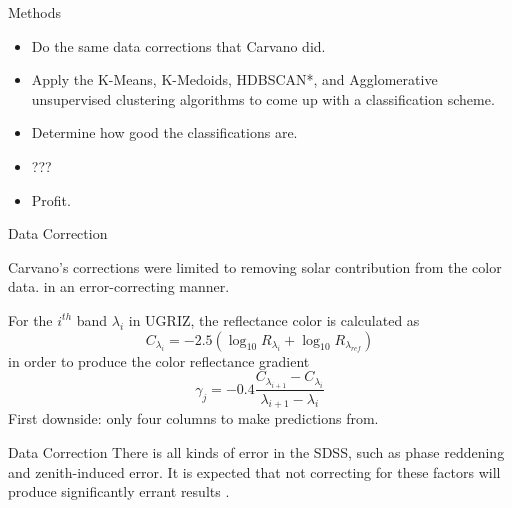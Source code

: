 \documentclass[10pt,xcolor={table,dvipsnames},t]{beamer}
\begin{document}
\begin{frame}{Methods}
\begin{itemize}
    \item Do the same data corrections that Carvano did.
    \item Apply the K-Means, K-Medoids, HDBSCAN*, and Agglomerative unsupervised clustering algorithms to come up with a classification scheme.
    \item Determine how good the classifications are.
    \item ???
    \item Profit.
\end{itemize}
\end{frame}

\begin{frame}{Data Correction}
\begin{itemize}
Carvano's corrections were limited to removing solar contribution from the color data. in an error-correcting manner.

For the $i^{th}$ band $\lambda_{i}$ in UGRIZ, the reflectance color is calculated as
$$
C_{\lambda_{i}} = -2.5\left(\log_{10}R_{\lambda_i} + \log_{10}R_{\lambda_{ref}} \right)
$$
in order to produce the color reflectance gradient 
$$
\gamma_{j} = -0.4\dfrac{C_{\lambda_{i + 1}} - C_{\lambda_{i}}}{\lambda_{i + 1} - \lambda_{i}}
$$
First downside: only four columns to make predictions from.
\end{itemize}
\end{frame}


\begin{frame}{Data Correction}
\vspace*{\fill}
There is all kinds of error in the SDSS, such as phase reddening and zenith-induced error. It is expected that not correcting for these factors will produce significantly errant results \cite{sanchez, hm_gmode}.
\vspace*{\fill}
\end{frame}
\end{document}
